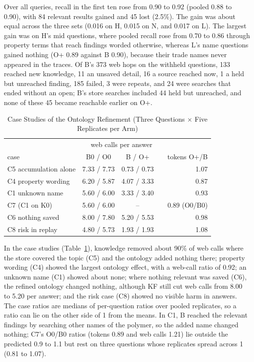 \documentclass[journal=mamobx,manuscript=suppinfo]{achemso}
\begin{document}
Over all queries, recall in the first ten rose from 0.90 to 0.92 (pooled 0.88 to 0.90), with 84 relevant results gained and 45 lost (2.5\%).
The gain was about equal across the three sets (0.016 on H, 0.015 on N, and 0.017 on L).
The largest gain was on H's mid questions, where pooled recall rose from 0.70 to 0.86 through property terms that reach findings worded otherwise, whereas L's name questions gained nothing (O+ 0.89 against B 0.90), because their trade names never appeared in the traces.
Of B's 373 web hops on the withheld questions, 133 reached new knowledge, 11 an unsaved detail, 16 a source reached now, 1 a held but unreached finding, 185 failed, 3 were repeats, and 24 were searches that ended without an open; B's store searches included 44 held but unreached, and none of these 45 became reachable earlier on O+.

\begin{table}
  \caption{Case Studies of the Ontology Refinement (Three Questions $\times$ Five Replicates per Arm)}
  \label{tbl:cases}
  \begin{tabular}{lcccr}
    \toprule
    & \multicolumn{3}{c}{web calls per answer} & \\
    case & B0 / O0 & B / O+ & & tokens O+/B \\
    \midrule
    C5 accumulation alone & 7.33 / 7.73 & 0.73 / 0.73 & & 1.07 \\
    C4 property wording & 6.20 / 5.87 & 4.07 / 3.33 & & 0.87 \\
    C1 unknown name & 5.60 / 6.00 & 3.33 / 3.40 & & 0.93 \\
    C7 (C1 on K0) & 5.60 / 6.00 & -- & & 0.89 (O0/B0) \\
    C6 nothing saved & 8.00 / 7.80 & 5.20 / 5.53 & & 0.98 \\
    C8 risk in replay & 4.80 / 5.73 & 1.93 / 1.93 & & 1.08 \\
    \bottomrule
  \end{tabular}
\end{table}

In the case studies (Table~\ref{tbl:cases}), knowledge removed about 90\% of web calls where the store covered the topic (C5) and the ontology added nothing there; property wording (C4) showed the largest ontology effect, with a web-call ratio of 0.92; an unknown name (C1) showed about none; where nothing relevant was saved (C6), the refined ontology changed nothing, although KF still cut web calls from 8.00 to 5.20 per answer; and the risk case (C8) showed no visible harm in answers.
The case ratios are medians of per-question ratios over pooled replicates, so a ratio can lie on the other side of 1 from the means.
In C1, B reached the relevant findings by searching other names of the polymer, so the added name changed nothing; C7's O0/B0 ratios (tokens 0.89 and web calls 1.21) lie outside the predicted 0.9 to 1.1 but rest on three questions whose replicates spread across 1 (0.81 to 1.07).
\end{document}
